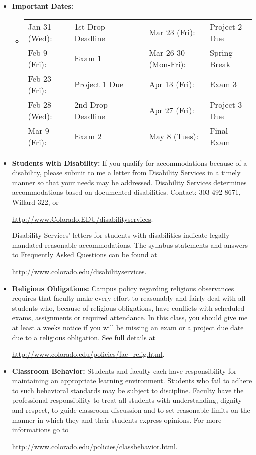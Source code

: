 \documentclass[12pt]{article}
\begin{document}

\begin{itemize}
  \item[] {\bf Important Dates:}
  \begin{itemize}
  \item[]
\begin{tabular}{@{}llllll}
Jan 31 (Wed): & 1st Drop Deadline &&&
   Mar 23 (Fri): & Project 2 Due\\
Feb 9 (Fri): & Exam 1 &&& 
  Mar 26-30  (Mon-Fri): & Spring Break\\
Feb 23 (Fri): & Project 1 Due &&&
  Apr 13  (Fri): & Exam 3 \\
Feb 28 (Wed): & 2nd Drop Deadline &&&
  Apr 27  (Fri): & Project 3 Due \\
Mar 9 (Fri): & Exam 2 &&&
   May 8 (Tues): & Final Exam
\end{tabular}
\end{itemize}

\item[] {\bf Students with Disability:} If you qualify for accommodations because of a disability, please submit to me a letter from Disability Services in a timely manner so that your needs may be addressed.  Disability Services determines accommodations based on documented disabilities.  Contact: 303-492-8671, Willard 322, or\\
\smallskip
	\centerline{\url{http://www.Colorado.EDU/disabilityservices}.}  
Disability Services' letters for students with disabilities indicate legally mandated reasonable accommodations.  The syllabus statements and answers to Frequently Asked Questions can be found at\\
\smallskip
	\centerline{\url{http://www.colorado.edu/disabilityservices}.}

\item[] {\bf Religious Obligations:} Campus policy regarding religious observances requires that faculty make every effort to reasonably and fairly deal with all students who, because of religious obligations, have conflicts with scheduled exams, assignments or required attendance.  In this class, you should give me at least a weeks notice if you will be missing an exam or a project due date due to a religious obligation. See full details at\\
\smallskip
	 \centerline{\url{http://www.colorado.edu/policies/fac_relig.html}.}

\item[] {\bf Classroom Behavior:} Students and faculty each have responsibility for maintaining an appropriate learning environment. Students who fail to adhere to such behavioral standards may be subject to discipline. Faculty have the professional responsibility to treat all students with understanding, dignity and respect, to guide classroom discussion and to set reasonable limits on the manner in which they and their students express opinions.  For more informations go to\\
\smallskip
	\centerline{\url{http://www.colorado.edu/policies/classbehavior.html}.}


\end{itemize}
\end{document}
